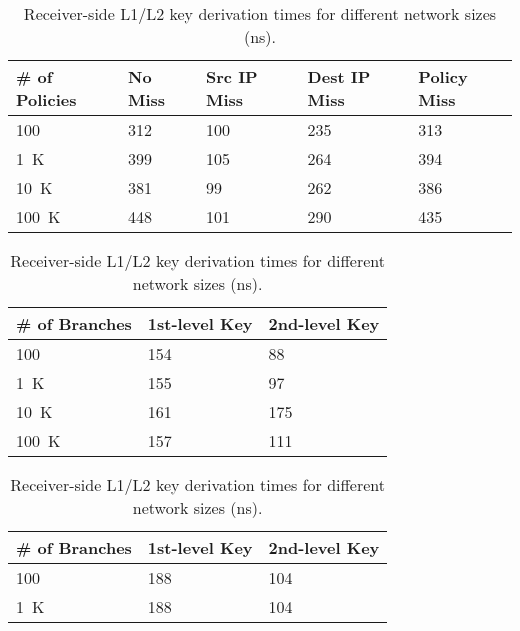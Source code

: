 \begin{table}[htb]
	\begin{minipage}{.47\linewidth}
		\caption{Benchmark results for the transfer policy lookup (ns).}
		\label{tab:authorization}
		\begin{tabularx}{1\linewidth}{X|XXXX}
			\toprule
			\# of Policies & No Miss & Src IP Miss & Dest IP Miss & Policy Miss \\
			\midrule
			100            & 312     & 100         & 235          & 313         \\
			\SI{1}{K}      & 399     & 105         & 264          & 394         \\
			\SI{10}{K}     & 381     & 99          & 262          & 386         \\
			\SI{100}{K}    & 448     & 101         & 290          & 435         \\
			\bottomrule
		\end{tabularx}
	\end{minipage}\hspace{2em}
	\begin{minipage}{.47\linewidth}
		\caption{Sender-side L1 key lookup and L2 key derivation times for different network sizes (ns).}
		\label{tab:derivation_send}
		\begin{tabularx}{1\linewidth}{X|XX}
			\toprule
			\# of Branches & 1st-level Key & 2nd-level Key \\
			\midrule
			100            & 154           & 88            \\	%
			\SI{1}{K}      & 155           & 97            \\	%
			\SI{10}{K}     & 161           & 175           \\	%
			\SI{100}{K}    & 157           & 111           \\	%
			\bottomrule
		\end{tabularx}
	\end{minipage}\vspace{2em}
	\begin{minipage}{.47\linewidth}
		\caption{Receiver-side L1/L2 key derivation times for different network sizes (ns).}
		\label{tab:derivation_rec}
		\begin{tabularx}{1\linewidth}{X|XX}
			\toprule
			\# of Branches & 1st-level Key & 2nd-level Key \\
			\midrule
			100            & 188           & 104           \\	%
			\SI{1}{K}      & 188           & 104           \\	%

\end{tabularx}
\end{minipage}
\end{table}
